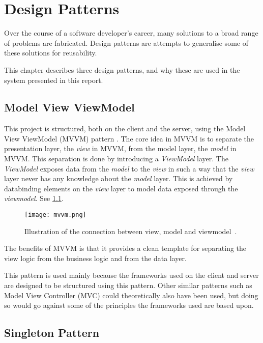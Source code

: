 \chapter{Design Patterns}
\label{designPattern}
Over the course of a software developer's career, many solutions to a broad range of
problems are fabricated. Design patterns are attempts to generalise some of these solutions
for reusability.

This chapter describes three design patterns, and why these are used
in the system presented in this report.

\section{Model View ViewModel}

This project is structured, both on the client and the server, using
the Model View ViewModel (MVVM) pattern \cite{mvvm}. The core idea in MVVM is to
separate the presentation layer, the \textit{view} in MVVM, from the model
layer, the \textit{model} in MVVM. This separation is done by introducing a
\textit{ViewModel} layer. The \textit{ViewModel} exposes data from the \textit{model} to the \textit{view}
in such a way that the \textit{view} layer never has any knowledge about the
\textit{model} layer. This is achieved by databinding elements on the \textit{view}
layer to model data exposed through the \textit{viewmodel}. See \cref{fig:mvvm}.

\begin{figure}[hbtp]
  \centering
  \texttt{[image: mvvm.png]}
  \caption[Illustration of MVVM.]{Illustration of the connection between view, model and
    viewmodel~\cite{mvvm}.}\label{fig:mvvm}
\end{figure}

The benefits of MVVM is that it provides a clean template for
separating the view logic from the business logic and from the data
layer.

This pattern is used mainly because the frameworks used on the client
and server are designed to be structured using this pattern. Other
similar patterns such as Model View Controller (MVC) could
theoretically also have been used, but doing so would go against some
of the principles the frameworks used are based upon.

\section{Singleton Pattern}


